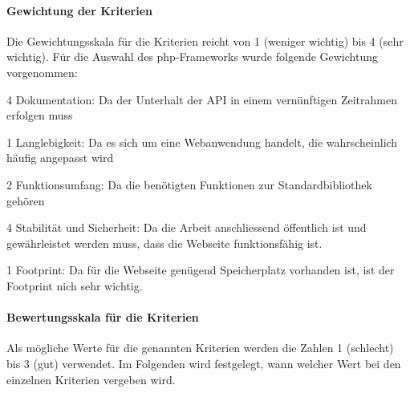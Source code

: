 \paragraph*{Gewichtung der Kriterien}
Die Gewichtungsskala für die Kriterien reicht von 1 (weniger wichtig) bis 4 (sehr wichtig). Für die Auswahl des php-Frameworks wurde folgende Gewichtung vorgenommen:

\begin{itemize*}
\item 4 Dokumentation: Da der Unterhalt der API in einem vernünftigen Zeitrahmen erfolgen muss
\item 1 Langlebigkeit: Da es sich um eine Webanwendung handelt, die wahrscheinlich häufig angepasst wird
\item 2 Funktionsumfang: Da die benötigten Funktionen zur Standardbibliothek gehören
\item 4 Stabilität und Sicherheit: Da die Arbeit anschliessend öffentlich ist und gewährleistet werden muss, dass die Webseite funktionsfähig ist.
\item 1 Footprint: Da für die Webseite genügend Speicherplatz vorhanden ist, ist der Footprint nich sehr wichtig.
\end{itemize*}


\paragraph*{Bewertungsskala für die Kriterien}
Als mögliche Werte für die genannten Kriterien werden die Zahlen 1 (schlecht) bis 3 (gut) verwendet. Im Folgenden wird festgelegt, wann welcher Wert bei den einzelnen Kriterien vergeben wird.

